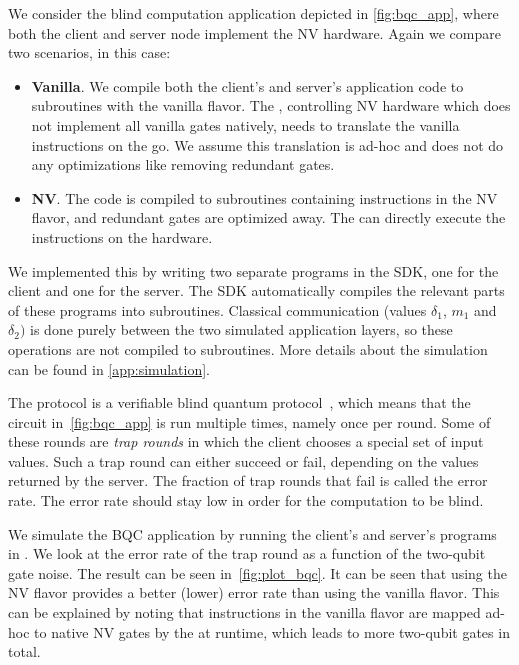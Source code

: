 We consider the blind computation application depicted in \cref{fig:bqc_app}, where both the client and server node implement the NV hardware.
Again we compare two scenarios, in this case:
\begin{itemize}
  \item \textbf{Vanilla}.
        We compile both the client's and server's application code to \netqasm subroutines with the vanilla flavor.
        The \QNPU, controlling NV hardware which does not implement all vanilla gates natively, needs to translate the vanilla instructions on the go.
        We assume this translation is ad-hoc and does not do any optimizations like removing redundant gates.
  \item \textbf{NV}.
        The code is compiled to \netqasm subroutines containing instructions in the NV flavor, and redundant gates are optimized away.
        The \QNPU can directly execute the instructions on the hardware.
\end{itemize}

We implemented this by writing two separate programs in the SDK, one for the client and one for the server.
The SDK automatically compiles the relevant parts of these programs into \netqasm subroutines.
Classical communication (values $\delta_1$, $m_1$ and $\delta_2)$ is done purely between the two simulated application layers, so these operations are not compiled to \netqasm subroutines.
More details about the simulation can be found in \cref{app:simulation}.

The protocol is a verifiable blind quantum protocol~\cite{fitzsimons2017unconditionally}, which means that the circuit in~\cref{fig:bqc_app} is run multiple times, namely once per round.
Some of these rounds are \textit{trap rounds} in which the client chooses a special set of input values.
Such a trap round can either succeed or fail, depending on the values returned by the server.
The fraction of trap rounds that fail is called the error rate.
The error rate should stay low in order for the computation to be blind.

We simulate the BQC application by running the client's and server's programs in \squidasm.
We look at the error rate of the trap round as a function of the two-qubit gate noise.
The result can be seen in~\cref{fig:plot_bqc}.
It can be seen that using the NV flavor provides a better (lower) error rate than using the vanilla flavor.
This can be explained by noting that \netqasm instructions in the vanilla flavor are mapped ad-hoc to native NV gates by the \QNPU at runtime, which leads to more two-qubit gates in total.


